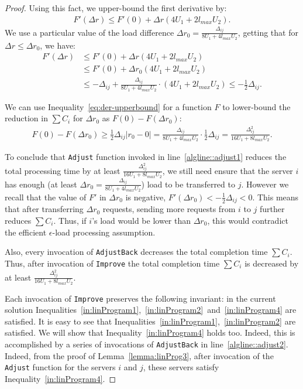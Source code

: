 \documentclass[11pt]{article}
\newcommand{\lmax}{{{l_{\mathit{max}}}}}
\begin{document}
\begin{proof}
Using this fact, we upper-bound the first derivative by:
\begin{align*}
F'(\Delta r) \leq F'(0) + \Delta r(4U_1 + 2\lmax U_2).
\end{align*}
We use a particular value of the load difference $\Delta r_0 = \frac{\Delta_{ij}}{8U_1 + 4\lmax U_2}$, getting that for $\Delta r \leq \Delta r_0$, we have: 
\begin{align*}
F'(\Delta r) & \leq F'(0) + \Delta r(4U_1 + 2\lmax U_2) \\
  & \leq F'(0) + \Delta r_0(4U_1 + 2\lmax U_2) \\ 
  & \leq -\Delta_{ij} + \frac{\Delta_{ij}}{8U_1 + 4\lmax U_2} \cdot (4U_1 + 2\lmax U_2) \leq -\frac{1}{2}\Delta_{ij} \textrm{.}
\end{align*}

We can use Inequality~\ref{eq:der-upperbound} for a function $F$ to lower-bound the reduction in $\sum{C_i}$ for $\Delta r_0$ as $F(0) - F(\Delta r_0)$:
\begin{align*}
F(0) - F(\Delta r_0) \geq \frac{1}{2}\Delta_{ij}|r_0 - 0| = \frac{\Delta_{ij}}{8U_1 + 4\lmax U_2} \cdot \frac{1}{2}\Delta_{ij} = \frac{\Delta_{ij}^2}{16U_1 + 8\lmax U_2} \textrm{.}
\end{align*}



To conclude that \texttt{Adjust} function invoked in line~\ref{algline::adjust1} reduces the total processing time by at least $\frac{\Delta_{ij}^2}{16U_1 + 8\lmax U_2}$, we still need ensure that the server $i$ has enough (at least $\Delta r_0 = \frac{\Delta_{ij}}{8U_1 + 4\lmax U_2}$) load to be transferred to $j$. However we recall that the value of $F'$ in $\Delta r_0$ is negative, $F'(\Delta r_0) < -\frac{1}{2}\Delta_{ij} < 0$. This means that after transferring $\Delta r_0$ requests, sending more requests from $i$ to $j$ further reduces $\sum{C_i}$.
Thus, if $i$'s load would be lower than $\Delta r_0$, this would contradict the efficient $\epsilon$-load processing assumption.



Also, every invocation of \texttt{AdjustBack} decreases the total completion time $\sum{C_i}$. Thus,  after invocation of \texttt{Improve} the total completion time $\sum{C_i}$ is decreased by at least $\frac{\Delta_{ij}^2}{16U_1 + 8\lmax U_2}$.

Each invocation of \texttt{Improve} preserves the following invariant: in the current solution Inequalities~\ref{in:linProgram1},~\ref{in:linProgram2}~and~\ref{in:linProgram4} are satisfied. It is easy to see that Inequalities~\ref{in:linProgram1},~\ref{in:linProgram2} are satisfied. We will show that Inequality~\ref{in:linProgram4} holds too. Indeed, this is accomplished by a series of invocations of \texttt{AdjustBack} in line~\ref{algline::adjust2}. Indeed, from the proof of Lemma~\ref{lemma:linProg3}, after invocation of the \texttt{Adjust} function for the servers $i$ and $j$, these servers satisfy Inequality~\ref{in:linProgram4}. 


\end{proof}
\end{document}
